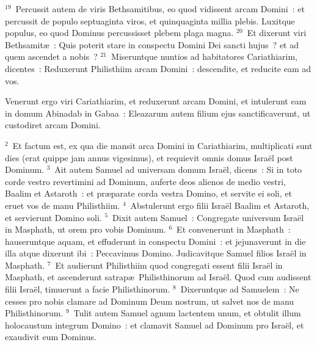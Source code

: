 ${}^{19}$~Percussit autem de viris Bethsamitibus, eo quod vidissent arcam Domini~: et percussit de populo septuaginta viros, et quinquaginta millia plebis. Luxitque populus, eo quod Dominus percussisset plebem plaga magna.
${}^{20}$~Et dixerunt viri Bethsamit\ae~: Quis poterit stare in conspectu Domini Dei sancti hujus~? et ad quem ascendet a nobis~?
${}^{21}$~Miseruntque nuntios ad habitatores Cariathiarim, dicentes~: Reduxerunt Philisthiim arcam Domini~: descendite, et reducite eam ad vos.

\lettrine[lines=10,image=true,loversize=0.05,lraise=-0.03]{V}{}enerunt ergo viri Cariathiarim, et reduxerunt arcam Domini, et intulerunt eam in domum Abinadab in Gabaa~: Eleazarum autem filium ejus sanctificaverunt, ut custodiret arcam Domini.


${}^{2}$~Et factum est, ex qua die mansit arca Domini in Cariathiarim, multiplicati sunt dies (erat quippe jam annus vigesimus), et requievit omnis domus Isra\"el post Dominum.
${}^{3}$~Ait autem Samuel ad universam domum Isra\"el, dicens~: Si in toto corde vestro revertimini ad Dominum, auferte deos alienos de medio vestri, Baalim et Astaroth~: et pr\ae parate corda vestra Domino, et servite ei soli, et eruet vos de manu Philisthiim.
${}^{4}$~Abstulerunt ergo filii Isra\"el Baalim et Astaroth, et servierunt Domino soli.
${}^{5}$~Dixit autem Samuel~: Congregate universum Isra\"el in Masphath, ut orem pro vobis Dominum.
${}^{6}$~Et convenerunt in Masphath~: hauseruntque aquam, et effuderunt in conspectu Domini~: et jejunaverunt in die illa atque dixerunt ibi~: Peccavimus Domino. Judicavitque Samuel filios Isra\"el in Masphath.
${}^{7}$~Et audierunt Philisthiim quod congregati essent filii Isra\"el in Masphath, et ascenderunt satrap\ae\ Philisthinorum ad Isra\"el. Quod cum audissent filii Isra\"el, timuerunt a facie Philisthinorum.
${}^{8}$~Dixeruntque ad Samuelem~: Ne cesses pro nobis clamare ad Dominum Deum nostrum, ut salvet nos de manu Philisthinorum.
${}^{9}$~Tulit autem Samuel agnum lactentem unum, et obtulit illum holocaustum integrum Domino~: et clamavit Samuel ad Dominum pro Isra\"el, et exaudivit eum Dominus.



